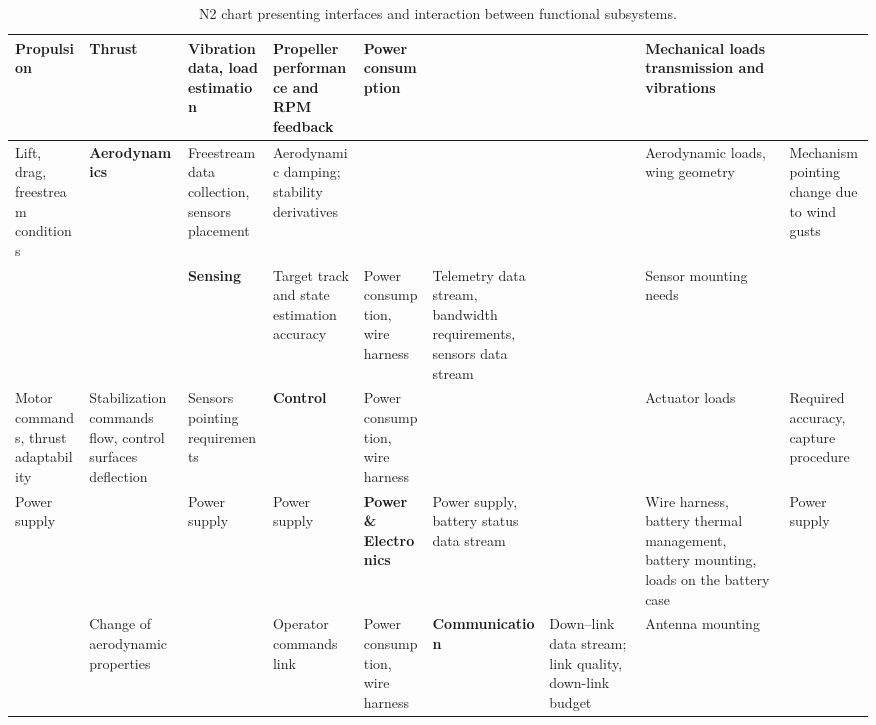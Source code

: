 
\begin{landscape}
\begin{table}[H]
\centering
\scriptsize
\caption{N2 chart presenting interfaces and interaction between functional subsystems.}
\label{tab:n2_chart_9x9}
\renewcommand{\arraystretch}{2} %
\begin{adjustbox}{max totalheight=0.95\textheight, max width=\linewidth}
\begin{tabularx}{\linewidth}{|X|X|X|X|X|X|X|X|X|}
\hline

\cellcolor{diagblue}\centering\textbf{Propulsion}
& Thrust
& Vibration data, load estimation
& Propeller performance and RPM feedback
& Power consumption
& 
& 
& Mechanical loads transmission and vibrations
& 
\tabularnewline \hline

Lift, drag, freestream conditions
& \cellcolor{diagblue}\centering\textbf{Aerodynamics}
& Freestream data collection, sensors placement
& Aerodynamic damping; stability derivatives
& 
& 
&
& Aerodynamic loads, wing geometry
& Mechanism pointing change due to wind gusts
\tabularnewline \hline

& 
& \cellcolor{diagblue}\centering\textbf{Sensing}
& Target track and state estimation accuracy
& Power consumption, wire harness 
& Telemetry data stream, bandwidth requirements, sensors data stream
& 
& Sensor mounting needs
& 
\tabularnewline \hline

Motor commands, thrust adaptability
& Stabilization commands flow, control surfaces deflection 
& Sensors pointing requirements
& \cellcolor{diagblue}\centering\textbf{Control}
& Power consumption, wire harness
& 
& 
& Actuator loads
& Required accuracy, capture procedure
\tabularnewline \hline

Power supply
& 
& Power supply
& Power supply
& \cellcolor{diagblue}\centering\textbf{Power \& Electronics}
& Power supply, battery status data stream
& 
& Wire harness, battery thermal management, battery mounting, loads on the battery case 
& Power supply
\tabularnewline \hline

& Change of aerodynamic properties
& 
& Operator commands link
& Power consumption, wire harness
& \cellcolor{diagblue}\centering\textbf{Communication}
& Down--link data stream; link quality, down-link budget
& Antenna mounting
& 
\tabularnewline \hline


\end{tabularx}
\end{adjustbox}
\end{table}
\end{landscape}
